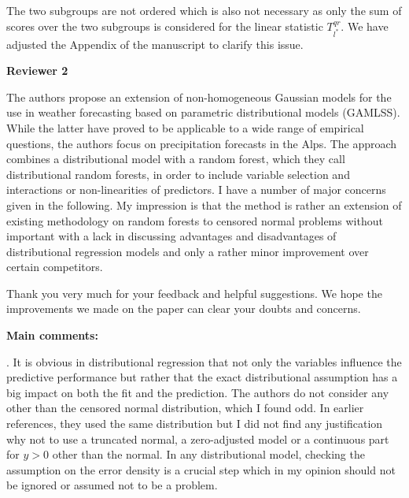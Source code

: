 \documentclass[american,foldmarks=false,noconfig]{uibklttr}
\newenvironment{review}{\fontshape{\itdefault}\fontseries{\bfdefault} \selectfont \smallskip}{\par}
\begin{document}
The two subgroups are not ordered which is also not necessary as only 
the sum of scores over the two subgroups is considered for the linear 
statistic $T_{l^{\ast}}^{qr}$. We have adjusted the Appendix of
the manuscript to clarify this issue.

\newpage


\textbf{\LARGE Reviewer 2}

\begin{review}
The authors propose an extension of non-homogeneous Gaussian models 
for the use in weather forecasting based on parametric distributional 
models (GAMLSS). While the latter have proved to be applicable to a 
wide range of empirical questions, the authors focus on precipitation 
forecasts in the Alps. The approach combines a distributional model 
with a random forest, which they call distributional random forests, 
in order to include variable selection and interactions or 
non-linearities of predictors. I have a number of major concerns 
given in the following. My impression is that the method is rather
an extension of existing methodology on random forests to censored 
normal problems without important with a lack in discussing 
advantages and disadvantages of distributional regression models 
and only a rather minor improvement over certain competitors.
\end{review}

Thank you very much for your feedback and helpful suggestions. We hope 
the improvements we made on the paper can clear your doubts and concerns.

\bigskip

\textbf{Main comments:}

\begin{review}
1. It is obvious in distributional regression that not only the 
variables influence the predictive performance but rather that 
the exact distributional assumption has a big impact on both the 
fit and the prediction. The authors do not consider any other
than the censored normal distribution, which I found odd. 
In earlier references, they used the same distribution but I 
did not find any justification why not to use a truncated normal, 
a zero-adjusted model or a continuous part for $y > 0$ other
than the normal. In any distributional model, checking the 
assumption on the error density is a crucial step which in 
my opinion should not be ignored or assumed not to be a problem.
\end{review}
\end{document}
